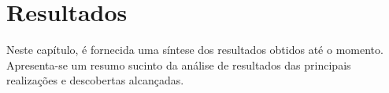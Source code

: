 \section{Resultados} \label{sec:result}

Neste capítulo, é fornecida uma síntese dos resultados obtidos até o momento. Apresenta-se um resumo sucinto da análise de resultados das principais realizações e descobertas alcançadas.






















  

%

 